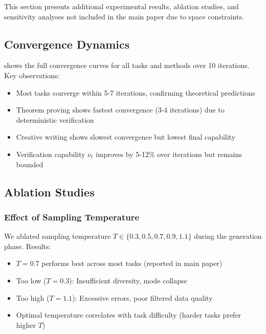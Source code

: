 \documentclass{article}
\theoremstyle{definition}
\theoremstyle{remark}
\begin{document}
This section presents additional experimental results, ablation studies, and sensitivity analyses not included in the main paper due to space constraints.

\subsection{Convergence Dynamics}

 shows the full convergence curves for all tasks and methods over 10 iterations. Key observations:
\begin{itemize}
\item Most tasks converge within 5-7 iterations, confirming theoretical predictions
\item Theorem proving shows fastest convergence (3-4 iterations) due to deterministic verification
\item Creative writing shows slowest convergence but lowest final capability
\item Verification capability \(\nu_t\) improves by 5-12\% over iterations but remains bounded
\end{itemize}


\subsection{Ablation Studies}

\subsubsection{Effect of Sampling Temperature}

We ablated sampling temperature \(T \in \{0.3, 0.5, 0.7, 0.9, 1.1\}\) during the generation phase. Results:
\begin{itemize}
\item \(T = 0.7\) performs best across most tasks (reported in main paper)
\item Too low (\(T = 0.3\)): Insufficient diversity, mode collapse
\item Too high (\(T = 1.1\)): Excessive errors, poor filtered data quality
\item Optimal temperature correlates with task difficulty (harder tasks prefer higher \(T\))
\end{itemize}
\end{document}
